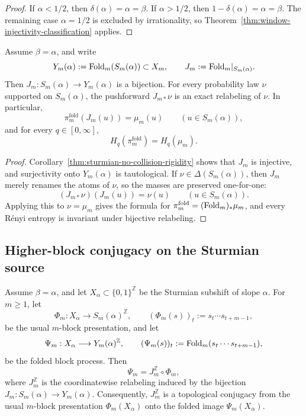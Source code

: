 \begin{proof}
If \(\alpha<1/2\), then \(\delta(\alpha)=\alpha=\beta\).  If
\(\alpha>1/2\), then \(1-\delta(\alpha)=\alpha=\beta\).  The remaining case
\(\alpha=1/2\) is excluded by irrationality, so
Theorem~\ref{thm:window-injectivity-classification} applies.
\end{proof}

\begin{corollary}\label{cor:sturmian-exact-relabeling}
Assume \(\beta=\alpha\), and write
\[
Y_m(\alpha):=\mathrm{Fold}_m(S_m(\alpha))\subset X_m,
\qquad
J_m:=\mathrm{Fold}_m|_{S_m(\alpha)}.
\]
Then \(J_m:S_m(\alpha)\to Y_m(\alpha)\) is a bijection. For every probability
law \(\nu\) supported on \(S_m(\alpha)\), the pushforward \(J_{m*}\nu\) is an
exact relabeling of \(\nu\). In particular,
\[
\pi_m^{\mathrm{fold}}(J_m(u))=\mu_m(u)
\qquad (u\in S_m(\alpha)),
\]
and for every \(q\in[0,\infty]\),
\[
H_q(\pi_m^{\mathrm{fold}})=H_q(\mu_m).
\]
\end{corollary}

\begin{proof}
Corollary~\ref{thm:sturmian-no-collision-rigidity} shows that \(J_m\) is
injective, and surjectivity onto \(Y_m(\alpha)\) is tautological. If
\(\nu\in\Delta(S_m(\alpha))\), then \(J_m\) merely renames the atoms of
\(\nu\), so the masses are preserved one-for-one:
\[
(J_{m*}\nu)(J_m(u))=\nu(u)
\qquad (u\in S_m(\alpha)).
\]
Applying this to \(\nu=\mu_m\) gives the formula for
\(\pi_m^{\mathrm{fold}}=(\mathrm{Fold}_m)_*\mu_m\), and every R\'enyi entropy is
invariant under bijective relabeling.
\end{proof}

\subsection{Higher-block conjugacy on the Sturmian source}

\begin{theorem}
\label{thm:sequence-level-transparency}
Assume \(\beta=\alpha\), and let \(X_\alpha\subset\{0,1\}^{\mathbb Z}\) be the
Sturmian subshift of slope \(\alpha\). For \(m\ge1\), let
\[
\Phi_m:X_\alpha\longrightarrow S_m(\alpha)^{\mathbb Z},
\qquad
(\Phi_m(s))_t:=s_t\cdots s_{t+m-1},
\]
be the usual \(m\)-block presentation, and let
\[
\Psi_m:X_\alpha\longrightarrow Y_m(\alpha)^{\mathbb Z},
\qquad
(\Psi_m(s))_t:=\mathrm{Fold}_m(s_t\cdots s_{t+m-1}),
\]
be the folded block process. Then
\[
\Psi_m=J_m^{\mathbb Z}\circ \Phi_m,
\]
where \(J_m^{\mathbb Z}\) is the coordinatewise relabeling induced by the
bijection \(J_m:S_m(\alpha)\to Y_m(\alpha)\). Consequently,
\(J_m^{\mathbb Z}\) is a topological conjugacy from the usual \(m\)-block
presentation \(\Phi_m(X_\alpha)\) onto the folded image \(\Psi_m(X_\alpha)\).
\end{theorem}


